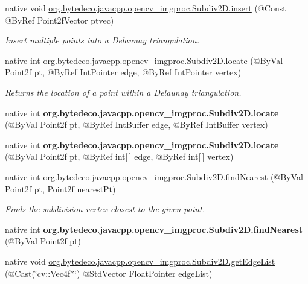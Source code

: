 \begin{DoxyCompactItemize}
native void \hyperlink{group__imgproc_gaf5f1f193cf48fd1c0b5db28cd98980bd}{org.\+bytedeco.\+javacpp.\+opencv\+\_\+imgproc.\+Subdiv2\+D.\+insert} (@Const @By\+Ref Point2f\+Vector ptvec)
\begin{DoxyCompactList}\small\item\em Insert multiple points into a Delaunay triangulation. \end{DoxyCompactList}\item 
native int \hyperlink{group__imgproc_gaa9df1660d91df22b6555929190798bbc}{org.\+bytedeco.\+javacpp.\+opencv\+\_\+imgproc.\+Subdiv2\+D.\+locate} (@By\+Val Point2f pt, @By\+Ref Int\+Pointer edge, @By\+Ref Int\+Pointer vertex)
\begin{DoxyCompactList}\small\item\em Returns the location of a point within a Delaunay triangulation. \end{DoxyCompactList}\item 
\mbox{\label{group__imgproc_ga4dabe651921cd62b2dfb6cc9d1c89646}} 
native int {\bfseries org.\+bytedeco.\+javacpp.\+opencv\+\_\+imgproc.\+Subdiv2\+D.\+locate} (@By\+Val Point2f pt, @By\+Ref Int\+Buffer edge, @By\+Ref Int\+Buffer vertex)
\item 
\mbox{\label{group__imgproc_gad1f5b9f1a4037ae49a6182a83e6573d4}} 
native int {\bfseries org.\+bytedeco.\+javacpp.\+opencv\+\_\+imgproc.\+Subdiv2\+D.\+locate} (@By\+Val Point2f pt, @By\+Ref int\mbox{[}$\,$\mbox{]} edge, @By\+Ref int\mbox{[}$\,$\mbox{]} vertex)
\item 
native int \hyperlink{group__imgproc_gaf945545a23188d47dc1fdfb4332707be}{org.\+bytedeco.\+javacpp.\+opencv\+\_\+imgproc.\+Subdiv2\+D.\+find\+Nearest} (@By\+Val Point2f pt, Point2f nearest\+Pt)
\begin{DoxyCompactList}\small\item\em Finds the subdivision vertex closest to the given point. \end{DoxyCompactList}\item 
\mbox{\label{group__imgproc_ga0a345bbd754ff621754c9b78b110cbfd}} 
native int {\bfseries org.\+bytedeco.\+javacpp.\+opencv\+\_\+imgproc.\+Subdiv2\+D.\+find\+Nearest} (@By\+Val Point2f pt)
\item 
native void \hyperlink{group__imgproc_ga8171761378651c75f5e8ed774c54fa55}{org.\+bytedeco.\+javacpp.\+opencv\+\_\+imgproc.\+Subdiv2\+D.\+get\+Edge\+List} (@Cast(\char`\"{}cv\+::\+Vec4f$\ast$\char`\"{}) @Std\+Vector Float\+Pointer edge\+List)

\end{DoxyCompactItemize}
